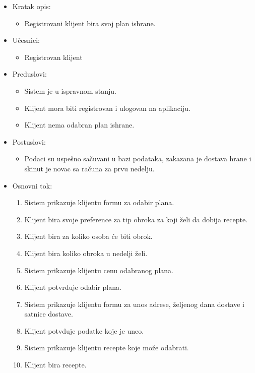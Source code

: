 \begin{itemize}
    \item Kratak opis:
        \begin{itemize}
            \item Registrovani klijent bira svoj plan ishrane.
        \end{itemize}
    \item Učesnici:
        \begin{itemize}
            \item Registrovan klijent
        \end{itemize}
    \item Preduslovi:
        \begin{itemize}
            \item Sistem je u ispravnom stanju.
            \item Klijent mora biti registrovan i ulogovan na aplikaciju.
            \item Klijent nema odabran plan ishrane.
        \end{itemize}
    \item Postuslovi:
        \begin{itemize}
            \item Podaci su uspešno sačuvani u bazi podataka, zakazana je dostava hrane i skinut je novac sa računa za prvu nedelju.
        \end{itemize}
    \item Osnovni tok:
        \begin{enumerate}
            \item Sistem prikazuje klijentu formu za odabir plana.
            \item Klijent bira svoje preference za tip obroka za koji želi da dobija recepte.
            \item Klijent bira za koliko osoba će biti obrok.
            \item Klijent bira koliko obroka u nedelji želi.
            \item Sistem prikazuje klijentu cenu odabranog plana.
            \item Klijent potvrđuje odabir plana.
            \item Sistem prikazuje klijentu formu za unos adrese, željenog dana dostave i satnice dostave.
            \item Klijent potvđuje podatke koje je uneo.
            \item Sistem prikazuje klijentu recepte koje može odabrati.
            \item Klijent bira recepte.

\end{enumerate}
\end{itemize}
